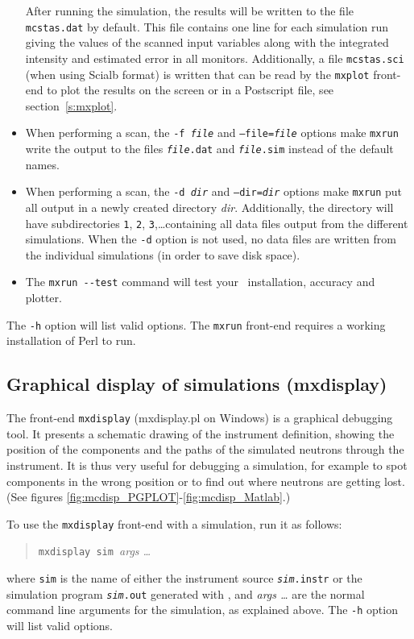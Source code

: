 \begin{itemize}
After running the simulation, the results will be written to the file
\verb+mcstas.dat+ by default. This file contains one line for each
simulation run giving the values of the scanned input variables along
with the integrated intensity and estimated error in all monitors. Additionally, a
file \verb+mcstas.sci+ (when using Scialb format) is written that can be read by the \verb+mxplot+
front-end to plot the results on the screen or in a Postscript file, see
section~\ref{s:mxplot}. 
\item When performing a scan, the \texttt{-f \textit{file}} and
  \texttt{--file=\textit{file}} options make \verb+mxrun+ write the output
  to the files \texttt{\textit{file\/}.dat} and \texttt{\textit{file\/}.sim}
  instead of the default names.
\item When performing a scan, the \texttt{-d \textit{dir}} and
  \texttt{--dir=\textit{dir}} options make \verb+mxrun+ put all output in a
  newly created directory \textit{dir}. Additionally, the directory will
  have subdirectories \verb+1+, \verb+2+, \verb+3+,\ldots containing all
  data files output from the different simulations. When the \verb+-d+
  option is not used, no data files are written from the individual
  simulations (in order to save disk space).
\item The \verb+mxrun --test+ command will test your \MCX\ installation, accuracy and plotter. 
\end{itemize}

The \verb+-h+ option will list valid options. The \verb+mxrun+ front-end requires a working installation of Perl to run.


\subsection{Graphical display of simulations (mxdisplay)}
\label{s:mxdisplay}

The front-end \verb+mxdisplay+ (mxdisplay.pl on Windows) is a graphical debugging tool.
It presents a schematic drawing of the instrument
definition, showing the position of the components and the paths of the
simulated neutrons through the instrument. It is thus very useful for
debugging a simulation, for example to spot components in the wrong
position or to find out where neutrons are getting lost.
(See figures \ref{fig:mcdisp_PGPLOT}-\ref{fig:mcdisp_Matlab}.)

To use the \verb+mxdisplay+ front-end with a simulation, run it as
follows:
\begin{quote}
  \verb+mxdisplay sim +\textit{args \ldots}
\end{quote}
where \verb+sim+ is the name of either the instrument source \texttt{\textit{sim}.instr} or the simulation program \texttt{\textit{sim}.out} generated with
\MCX, and \textit{args \ldots} are the normal command line arguments for
the simulation, as explained above. The \verb+-h+ option will list valid options.

